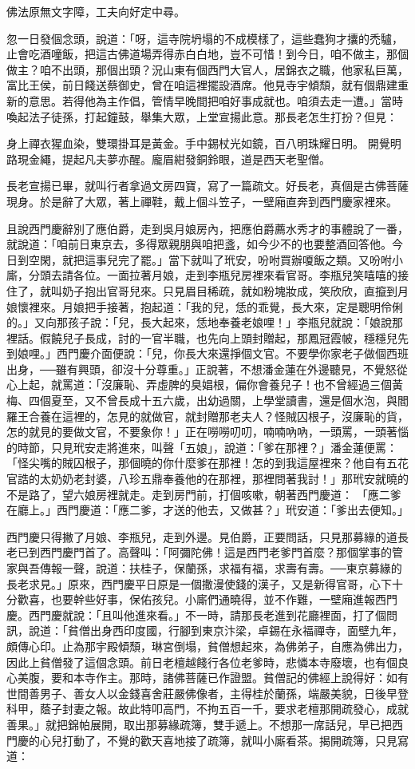 佛法原無文字障，工夫向好定中尋。

忽一日發個念頭，說道：「呀，這寺院坍塌的不成模樣了，這些蠢狗才攮的禿驢，止會吃酒噇飯，把這古佛道場弄得赤白白地，豈不可惜！到今日，咱不做主，那個做主？咱不出頭，那個出頭？況山東有個西門大官人，居錦衣之職，他家私巨萬，富比王侯，前日餞送蔡御史，曾在咱這裡擺設酒席。他見寺宇傾頹，就有個鼎建重新的意思。若得他為主作倡，管情早晚間把咱好事成就也。咱須去走一遭。」當時喚起法子徒孫，打起鐘鼓，舉集大眾，上堂宣揚此意。那長老怎生打扮？但見：

身上禪衣猩血染，雙環掛耳是黃金。手中錫杖光如鏡，百八明珠耀日明。
開覺明路現金繩，提起凡夫夢亦醒。龐眉紺發銅鈴眼，道是西天老聖僧。

長老宣揚已畢，就叫行者拿過文房四寶，寫了一篇疏文。好長老，真個是古佛菩薩現身。於是辭了大眾，著上禪鞋，戴上個斗笠子，一壁廂直奔到西門慶家裡來。

且說西門慶辭別了應伯爵，走到吳月娘房內，把應伯爵薦水秀才的事體說了一番，就說道：「咱前日東京去，多得眾親朋與咱把盞，如今少不的也要整酒回答他。今日到空閑，就把這事兒完了罷。」當下就叫了玳安，吩咐買辦嗄飯之類。又吩咐小廝，分頭去請各位。一面拉著月娘，走到李瓶兒房裡來看官哥。李瓶兒笑嘻嘻的接住了，就叫奶子抱出官哥兒來。只見眉目稀疏，就如粉塊妝成，笑欣欣，直攛到月娘懷裡來。月娘把手接著，抱起道：「我的兒，恁的乖覺，長大來，定是聰明伶俐的。」又向那孩子說：「兒，長大起來，恁地奉養老娘哩！」李瓶兒就說：「娘說那裡話。假饒兒子長成，討的一官半職，也先向上頭封贈起，那鳳冠霞帔，穩穩兒先到娘哩。」西門慶介面便說：「兒，你長大來還掙個文官。不要學你家老子做個西班出身，──雖有興頭，卻沒十分尊重。」正說著，不想潘金蓮在外邊聽見，不覺怒從心上起，就罵道：「沒廉恥、弄虛脾的臭娼根，偏你會養兒子！也不曾經過三個黃梅、四個夏至，又不曾長成十五六歲，出幼過關，上學堂讀書，還是個水泡，與閻羅王合養在這裡的，怎見的就做官，就封贈那老夫人？怪賊囚根子，沒廉恥的貨，怎的就見的要做文官，不要象你！」正在嘮嘮叨叨，喃喃吶吶，一頭罵，一頭著惱的時節，只見玳安走將進來，叫聲「五娘」，說道：「爹在那裡？」潘金蓮便罵：「怪尖嘴的賊囚根子，那個曉的你什麼爹在那裡！怎的到我這屋裡來？他自有五花官誥的太奶奶老封婆，八珍五鼎奉養他的在那裡，那裡問著我討！」那玳安就曉的不是路了，望六娘房裡就走。走到房門前，打個咳嗽，朝著西門慶道： 「應二爹在廳上。」西門慶道：「應二爹，才送的他去，又做甚？」玳安道：「爹出去便知。」

西門慶只得撇了月娘、李瓶兒，走到外邊。見伯爵，正要問話，只見那募緣的道長老已到西門慶門首了。高聲叫：「阿彌陀佛！這是西門老爹門首麼？那個掌事的管家與吾傳報一聲，說道：扶桂子，保蘭孫，求福有福，求壽有壽。──東京募緣的長老求見。」原來，西門慶平日原是一個撒漫使錢的漢子，又是新得官哥，心下十分歡喜，也要幹些好事，保佑孩兒。小廝們通曉得，並不作難，一壁廂進報西門慶。西門慶就說：「且叫他進來看。」不一時，請那長老進到花廳裡面，打了個問訊，說道：「貧僧出身西印度國，行腳到東京汴梁，卓錫在永福禪寺，面壁九年，頗傳心印。止為那宇殿傾頹，琳宮倒塌，貧僧想起來，為佛弟子，自應為佛出力，因此上貧僧發了這個念頭。前日老檀越餞行各位老爹時，悲憐本寺廢壞，也有個良心美腹，要和本寺作主。那時，諸佛菩薩已作證盟。貧僧記的佛經上說得好：如有世間善男子、善女人以金錢喜舍莊嚴佛像者，主得桂於蘭孫，端嚴美貌，日後早登科甲，蔭子封妻之報。故此特叩高門，不拘五百一千，要求老檀那開疏發心，成就善果。」就把錦帕展開，取出那募緣疏簿，雙手遞上。不想那一席話兒，早已把西門慶的心兒打動了，不覺的歡天喜地接了疏簿，就叫小廝看茶。揭開疏簿，只見寫道：

